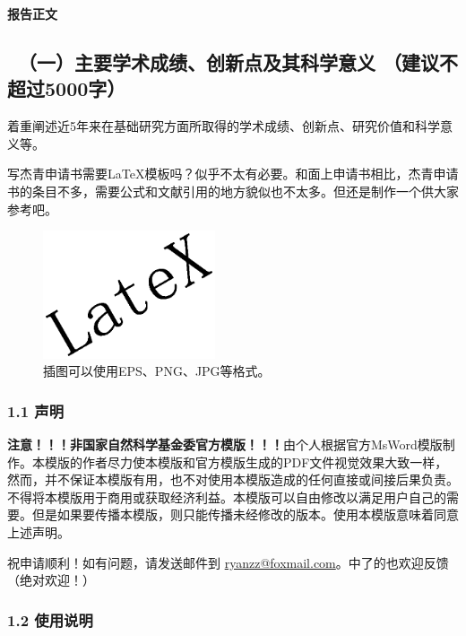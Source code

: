\documentclass[12pt,UTF8,AutoFakeBold=3,a4paper]{ctexart} %
\newcommand{\sanhao}{\fontsize{16pt}{\baselineskip}\selectfont}
\newcommand{\sihao}{\fontsize{14.2pt}{\baselineskip}\selectfont}
\begin{document}
\begin{center}
{\sanhao \kaishu \bfseries 报告正文}
\end{center}

{\sihao {}}
\vskip -5mm
{\color{MsBlue} \subsection{\sihao \kaishu \quad \ （一）主要学术成绩、创新点及其科学意义 \hskip 3mm \textnormal{\kaishu \sihao（建议不超过5000字） }} }
\vskip -3mm
{\color{MsBlue} \kaishu \sihao 着重阐述近5年来在基础研究方面所取得的学术成绩、创新点、研究价值和科学意义等。}

写杰青申请书需要\LaTeX 模板吗？似乎不太有必要。和面上申请书相比，杰青申请书的条目不多，需要公式和文献引用的地方貌似也不太多。但还是制作一个供大家参考吧。


\begin{figure}[!th]
\begin{center}
\includegraphics[width=2in]{fig-example.eps}
\caption{{\kaishu 插图可以使用EPS、PNG、JPG等格式。}}
\label{fig:example}
\end{center}
\end{figure}


\vskip 2mm
\subsubsection{1.1 声明}
{\bfseries \color{red} 注意！！！非国家自然科学基金委官方模版！！！}由个人根据官方MsWord模版制作。本模版的作者尽力使本模版和官方模版生成的PDF文件视觉效果大致一样，然而，并不保证本模版有用，也不对使用本模版造成的任何直接或间接后果负责。 不得将本模版用于商用或获取经济利益。本模版可以自由修改以满足用户自己的需要。但是如果要传播本模版，则只能传播未经修改的版本。使用本模版意味着同意上述声明。

祝申请顺利！如有问题，请发送邮件到 \href{mailto:ryanzz@foxmail.com}{ryanzz@foxmail.com}。中了的也欢迎反馈（绝对欢迎！）

\subsubsection{1.2 使用说明}\label{sss:instruction}
\end{document}
